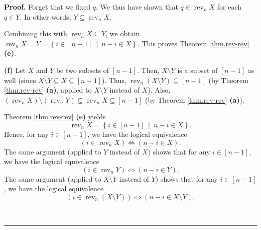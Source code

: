 \documentclass[numbers=enddot,12pt,final,onecolumn,notitlepage]{scrartcl}%
\theoremstyle{definition}
\newenvironment{proof}[1][Proof]{\noindent\textbf{#1.} }{\ \rule{0.5em}{0.5em}}
\begin{document}
\begin{proof}
Forget that we fixed $q$. We thus have shown that $q\in\operatorname*{rev}%
\nolimits_{n}X$ for each $q\in Y$. In other words, $Y\subseteq
\operatorname*{rev}\nolimits_{n}X$.

Combining this with $\operatorname*{rev}\nolimits_{n}X\subseteq Y$, we obtain
$\operatorname*{rev}\nolimits_{n}X=Y=\left\{  i\in\left[  n-1\right]
\ \mid\ n-i\in X\right\}  $. This proves Theorem \ref{thm.rev-rev}
\textbf{(e)}. \medskip

\textbf{(f)} Let $X$ and $Y$ be two subsets of $\left[  n-1\right]  $. Then,
$X\setminus Y$ is a subset of $\left[  n-1\right]  $ as well (since
$X\setminus Y\subseteq X\subseteq\left[  n-1\right]  $). Thus,
$\operatorname*{rev}\nolimits_{n}\left(  X\setminus Y\right)  \subseteq\left[
n-1\right]  $ (by Theorem \ref{thm.rev-rev} \textbf{(a)}, applied to
$X\setminus Y$ instead of $X$). Also, $\left(  \operatorname*{rev}%
\nolimits_{n}X\right)  \setminus\left(  \operatorname*{rev}\nolimits_{n}%
Y\right)  \subseteq\operatorname*{rev}\nolimits_{n}X\subseteq\left[
n-1\right]  $ (by Theorem \ref{thm.rev-rev} \textbf{(a)}).

Theorem \ref{thm.rev-rev} \textbf{(e)} yields
\[
\operatorname*{rev}\nolimits_{n}X=\left\{  i\in\left[  n-1\right]
\ \mid\ n-i\in X\right\}  .
\]
Hence, for any $i\in\left[  n-1\right]  $, we have the logical equivalence%
\begin{equation}
\left(  i\in\operatorname*{rev}\nolimits_{n}X\right)  \Longleftrightarrow
\left(  n-i\in X\right)  . \label{pf.thm.rev-rev.f.1}%
\end{equation}
The same argument (applied to $Y$ instead of $X$) shows that for any
$i\in\left[  n-1\right]  $, we have the logical equivalence%
\begin{equation}
\left(  i\in\operatorname*{rev}\nolimits_{n}Y\right)  \Longleftrightarrow
\left(  n-i\in Y\right)  . \label{pf.thm.rev-rev.f.2}%
\end{equation}
The same argument (applied to $X\setminus Y$ instead of $Y$) shows that for
any $i\in\left[  n-1\right]  $, we have the logical equivalence
\begin{equation}
\left(  i\in\operatorname*{rev}\nolimits_{n}\left(  X\setminus Y\right)
\right)  \Longleftrightarrow\left(  n-i\in X\setminus Y\right)  .
\label{pf.thm.rev-rev.f.3}%
\end{equation}



\end{proof}
\end{document}
